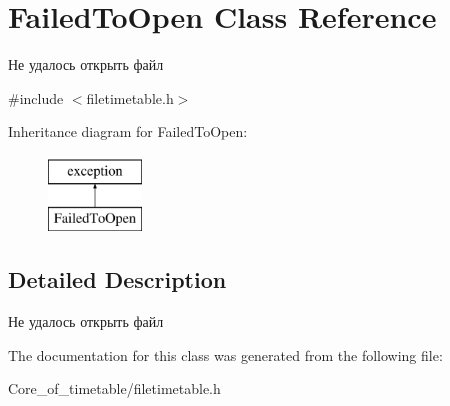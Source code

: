 \hypertarget{class_failed_to_open}{}\section{Failed\+To\+Open Class Reference}
\label{class_failed_to_open}


Не удалось открыть файл  




{\ttfamily \#include $<$filetimetable.\+h$>$}

Inheritance diagram for Failed\+To\+Open\+:\begin{figure}[H]
\begin{center}
\leavevmode
\includegraphics[height=2.000000cm]{class_failed_to_open}
\end{center}
\end{figure}


\subsection{Detailed Description}
Не удалось открыть файл 

The documentation for this class was generated from the following file\+:\begin{DoxyCompactItemize}
\item 
Core\+\_\+of\+\_\+timetable/filetimetable.\+h\end{DoxyCompactItemize}
